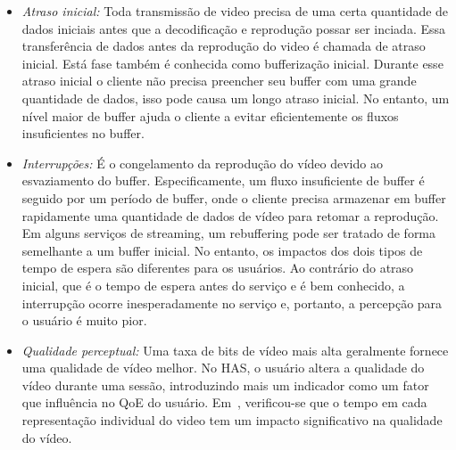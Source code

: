 
\begin{itemize}
\vspace{-0.05cm}
\item \textit{Atraso inicial:} Toda transmissão de video precisa de uma certa quantidade de dados iniciais antes que a decodificação e reprodução possar ser inciada. Essa transferência de dados antes da reprodução do video é chamada de atraso inicial. Está fase também é conhecida como bufferização inicial. Durante esse atraso inicial o cliente não precisa preencher seu buffer com uma grande quantidade de dados, isso pode causa um longo atraso inicial. No entanto, um nível maior de buffer ajuda o cliente a evitar eficientemente os fluxos insuficientes no buffer.
\vspace{-0.05cm}
\item \textit{Interrupções:} É o congelamento da reprodução do vídeo devido ao esvaziamento do buffer. Especificamente, um fluxo insuficiente de buffer é seguido por um período de buffer, onde o cliente precisa armazenar em buffer rapidamente uma quantidade de dados de vídeo para retomar a reprodução. 
Em alguns serviços de streaming, um rebuffering pode ser tratado de forma semelhante a um buffer inicial. No entanto, os impactos dos dois tipos de tempo de espera são diferentes para os usuários. Ao contrário do atraso inicial, que é o tempo de espera antes do serviço e é bem conhecido, a interrupção ocorre inesperadamente no serviço e, portanto, a percepção para o usuário é muito pior.%
\vspace{-0.05cm}
\item \textit{Qualidade perceptual:}
Uma taxa de bits de vídeo mais alta geralmente fornece uma qualidade de vídeo melhor. 
No HAS, o usuário altera a qualidade do vídeo durante uma sessão, introduzindo mais um indicador como um fator que influência no QoE do usuário. 
Em~\cite{HoBfeld2014QoMEX}, verificou-se que o tempo em cada representação individual do video tem um impacto significativo na qualidade do vídeo.

\end{itemize}
